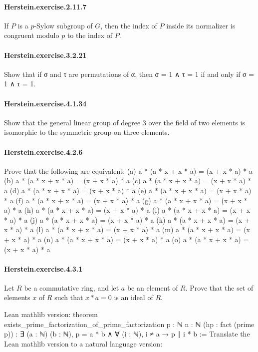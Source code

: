 \documentclass{article}
\begin{document}
\paragraph{Herstein.exercise.2.11.7} If $P$ is a $p$-Sylow subgroup of $G$, then the index of $P$ inside its normalizer is congruent modulo $p$ to the index of $P$.

\paragraph{Herstein.exercise.3.2.21} Show that if σ and τ are permutations of α, then σ = 1 ∧ τ = 1 if and only if σ = 1 ∧ τ = 1.

\paragraph{Herstein.exercise.4.1.34} Show that the general linear group of degree 3 over the field of two elements is isomorphic to the symmetric group on three elements.

\paragraph{Herstein.exercise.4.2.6} Prove that the following are equivalent:
  (a) a * (a * x + x * a) = (x + x * a) * a
  (b) a * (a * x + x * a) = (x + x * a) * a
  (c) a * (a * x + x * a) = (x + x * a) * a
  (d) a * (a * x + x * a) = (x + x * a) * a
  (e) a * (a * x + x * a) = (x + x * a) * a
  (f) a * (a * x + x * a) = (x + x * a) * a
  (g) a * (a * x + x * a) = (x + x * a) * a
  (h) a * (a * x + x * a) = (x + x * a) * a
  (i) a * (a * x + x * a) = (x + x * a) * a
  (j) a * (a * x + x * a) = (x + x * a) * a
  (k) a * (a * x + x * a) = (x + x * a) * a
  (l) a * (a * x + x * a) = (x + x * a) * a
  (m) a * (a * x + x * a) = (x + x * a) * a
  (n) a * (a * x + x * a) = (x + x * a) * a
  (o) a * (a * x + x * a) = (x + x * a) * a
  

\paragraph{Herstein.exercise.4.3.1} Let $R$ be a commutative ring, and let $a$ be an element of $R$. Prove that the set of elements $x$ of $R$ such that $x*a=0$ is an ideal of $R$.

Lean mathlib version:
theorem exists_prime_factorization_of_prime_factorization {p : ℕ} {n : ℕ} (hp : fact (prime p)) :
  ∃ (a : ℕ) (b : ℕ), p = a * b ∧ ∀ (i : ℕ), i ≠ a → p ∣ i * b :=
Translate the Lean mathlib version to a natural language version: 
\end{document}

